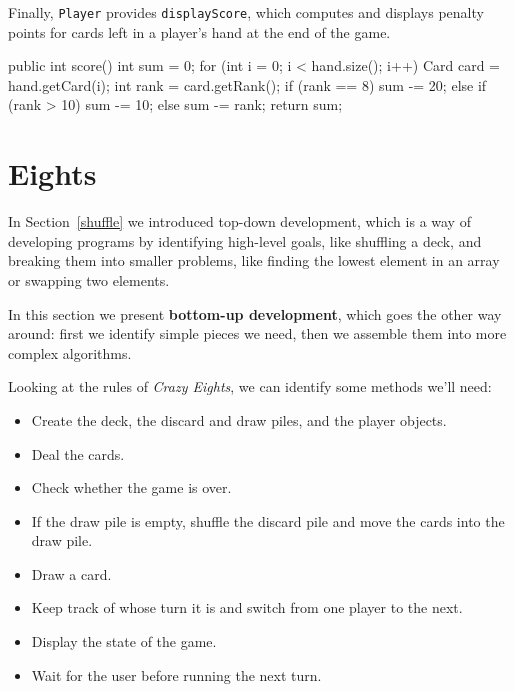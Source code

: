 \documentclass[12pt]{book}
\theoremstyle{exercise}
\newcommand{\java}[1]{\verb"#1"}
\begin{document}
Finally, \java{Player} provides \java{displayScore}, which computes and displays penalty points for cards left in a player's hand at the end of the game.

\begin{code}
    public int score() {
        int sum = 0;
        for (int i = 0; i < hand.size(); i++) {
            Card card = hand.getCard(i);
            int rank = card.getRank();
            if (rank == 8) {
                sum -= 20;
            } else if (rank > 10) {
                sum -= 10;
            } else {
                sum -= rank;
            }
        }
        return sum;
    }
\end{code}


\section{Eights}

In Section~\ref{shuffle} we introduced top-down development, which is a way of developing programs by identifying high-level goals, like shuffling a deck, and breaking them into smaller problems, like finding the lowest element in an array or swapping two elements.

In this section we present {\bf bottom-up development}, which goes the other way around: first we identify simple pieces we need, then we assemble them into more complex algorithms.

Looking at the rules of {\em Crazy Eights}, we can identify some methods we'll need:

\begin{itemize}

\item Create the deck, the discard and draw piles, and the player objects.

\item Deal the cards.

\item Check whether the game is over.

\item If the draw pile is empty, shuffle the discard pile and move the cards into the draw pile.

\item Draw a card.

\item Keep track of whose turn it is and switch from one player to the next.

\item Display the state of the game.

\item Wait for the user before running the next turn.

\end{itemize}
\end{document}
